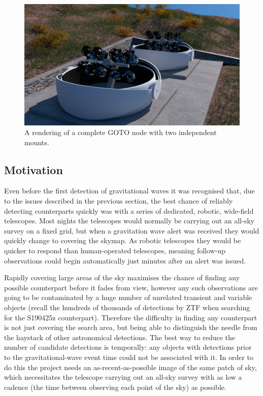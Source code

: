 \begin{colsection}
\begin{colsection}
\begin{figure}[p]
    \begin{center}
        \includegraphics[width=0.9\linewidth]{images/goto_render.png}
    \end{center}
    \caption[A rendering of a complete GOTO node]{
        A rendering of a complete GOTO node with two independent mounts.
    }\label{fig:goto_render}
\end{figure}

\end{colsection}


\subsection{Motivation}
\label{sec:goto_motivation}
\begin{colsection}

Even before the first detection of gravitational waves it was recognised that, due to the issues described in the previous section, the best chance of reliably detecting counterparts quickly was with a series of dedicated, robotic, wide-field telescopes. Most nights the telescopes would normally be carrying out an all-sky survey on a fixed grid, but when a gravitation wave alert was received they would quickly change to covering the skymap. As robotic telescopes they would be quicker to respond than human-operated telescopes, meaning follow-up observations could begin automatically just minutes after an alert was issued.

Rapidly covering large areas of the sky maximises the chance of finding any possible counterpart before it fades from view, however any such observations are going to be contaminated by a huge number of unrelated transient and variable objects (recall the hundreds of thousands of detections by ZTF when searching for the S190425z counterpart). Therefore the difficulty in finding any counterpart is not just covering the search area, but being able to distinguish the needle from the haystack of other astronomical detections. The best way to reduce the number of candidate detections is temporally: any objects with detections prior to the gravitational-wave event time could not be associated with it. In order to do this the project needs an as-recent-as-possible image of the same patch of sky, which necessitates the telescope carrying out an all-sky survey with as low a cadence (the time between observing each point of the sky) as possible.


\end{colsection}
\end{colsection}
